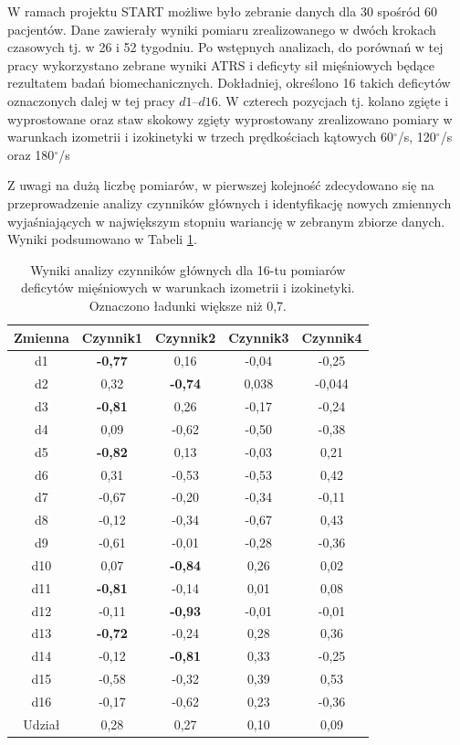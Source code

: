 W ramach projektu START możliwe było zebranie danych dla 30 spośród 60 pacjentów. Dane zawierały wyniki pomiaru zrealizowanego w dwóch krokach czasowych tj. w 26 i 52 tygodniu. Po wstępnych analizach, do porównań w tej pracy wykorzystano zebrane wyniki ATRS i deficyty sił mięśniowych będące rezultatem badań biomechanicznych. Dokładniej, określono 16 takich deficytów oznaczonych dalej w tej pracy $d1$--$d16$. W czterech pozycjach tj. kolano zgięte i wyprostowane oraz staw skokowy zgięty wyprostowany zrealizowano pomiary w warunkach izometrii i izokinetyki w trzech prędkościach kątowych 60$^\circ$/s, 120$^\circ$/s oraz 180$^\circ$/s  

Z uwagi na dużą liczbę pomiarów, w pierwszej kolejność zdecydowano się na przeprowadzenie analizy czynników głównych i identyfikację nowych zmiennych wyjaśniających w największym stopniu wariancję w zebranym zbiorze danych. Wyniki podsumowano w Tabeli \ref{tab:pca-muscles}.

\begin{table}[h]
	\centering
	\setlength{\tabcolsep}{3pt}
	\setlength\extrarowheight{2pt}
	\caption{Wyniki analizy czynników głównych dla 16-tu pomiarów deficytów mięśniowych w warunkach izometrii i izokinetyki. Oznaczono ładunki większe niż 0,7.}
	\label{tab:pca-muscles}
	\begin{tabular}{c|c|c|c|c}

		Zmienna&Czynnik1&Czynnik2&Czynnik3&Czynnik4 \\
		\hline
		d1&\textbf{-0,77}&0,16&-0,04&-0,25 \\
		\hline
		d2&0,32&\textbf{-0,74}&0,038&-0,044 \\
		\hline
		d3&\textbf{-0,81}&0,26&-0,17&-0,24 \\
		\hline
		d4&0,09&-0,62&-0,50&-0,38 \\
		\hline
		d5&\textbf{-0,82}&0,13&-0,03&0,21 \\
		\hline
		d6&0,31&-0,53&-0,53&0,42 \\
		\hline
		d7&-0,67&-0,20&-0,34&-0,11 \\
		\hline
		d8&-0,12&-0,34&-0,67&0,43 \\
		\hline
		d9&-0,61&-0,01&-0,28&-0,36 \\
		\hline
		d10&0,07&\textbf{-0,84}&0,26&0,02 \\
		\hline
		d11&\textbf{-0,81}&-0,14&0,01&0,08 \\
		\hline
		d12&-0,11&\textbf{-0,93}&-0,01&-0,01 \\
		\hline
		d13&\textbf{-0,72}&-0,24&0,28&0,36 \\
		\hline
		d14&-0,12&\textbf{-0,81}&0,33&-0,25 \\
		\hline
		d15&-0,58&-0,32&0,39&0,53 \\
		\hline
		d16&-0,17&-0,62&0,23&-0,36 \\
		\hline\hline
		Udział&0,28&0,27&0,10&0,09 \\

	\end{tabular}
\end{table}

